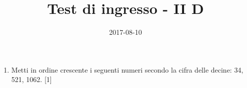 \documentclass[11pt,fleqn]{article} %
\title{Test di ingresso - II D}
\date{2017-08-10}
\begin{document}
\maketitle
\begin{enumerate}

\item Metti in ordine crescente i seguenti numeri secondo la cifra delle decine: 34, 521, 1062. [1] 
\end{enumerate}
\end{document}
